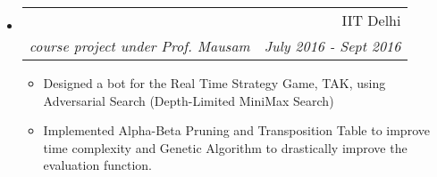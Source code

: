 \documentclass[letterpaper,11pt]{article}
\makeatletter
\newcommand{\MYhref}[3][blue]{\href{#2}{\color{#1}{#3}}}%
\newcommand{\ressubheading}[4]{
\begin{tabular*}{6.5in}{l@{\extracolsep{\fill}}r}
    \textbf{#1} & #2 \\
    \textit{#3} & \textit{#4} \\
\end{tabular*}\vspace{-6pt}}
\makeatother
\begin{document}
\begin{itemize}
\item
\ressubheading{\MYhref[black]{https://github.com/RohitNaikJ/TAK-Game-Player}{Artificial Game Player for TAK}}{IIT Delhi}{course project under Prof. Mausam}{July 2016 - Sept 2016}
\begin{itemize}
\item Designed a bot for the Real Time Strategy Game, TAK, using Adversarial Search (Depth-Limited MiniMax Search)
\item Implemented Alpha-Beta Pruning and Transposition Table to improve time complexity and Genetic Algorithm to drastically improve the evaluation function.
\end{itemize}






\end{itemize}
\end{document}
